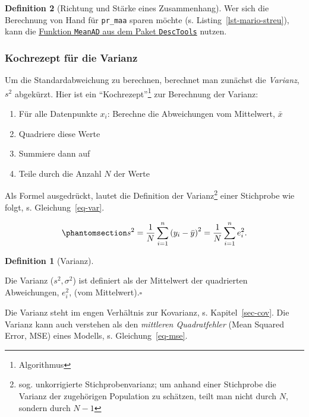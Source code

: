 \documentclass[
  a4paper,
  DIV=11]{scrreprt}
\providecommand{\tightlist}{%
  \setlength{\itemsep}{0pt}\setlength{\parskip}{0pt}}\usepackage{longtable,booktabs,array}
\theoremstyle{definition}
\theoremstyle{definition}
\theoremstyle{definition}
\newtheorem{definition}{Definition}[chapter]
\theoremstyle{remark}
\begin{document}
\begin{definition}[Richtung und Stärke eines
Zusammenhang]
Wer sich die Berechnung von Hand für \texttt{pr\_maa} sparen möchte (s.
Listing~\ref{lst-mario-streu}), kann die
\href{https://rdrr.io/cran/DescTools/man/MeanAD.html}{Funktion
\texttt{MeanAD} aus dem Paket \texttt{DescTools}} nutzen.

\subsubsection{Kochrezept für die
Varianz}\label{kochrezept-fuxfcr-die-varianz}

Um die Standardabweichung zu berechnen, berechnet man zunächst die
\emph{Varianz}, \(s^2\) abgekürzt. Hier ist ein
``Kochrezept''\footnote{Algorithmus} zur Berechnung der Varianz:

\begin{enumerate}
\def\labelenumi{\arabic{enumi}.}
\tightlist
\item
  Für alle Datenpunkte \(x_i\): Berechne die Abweichungen vom
  Mittelwert, \(\bar{x}\)
\item
  Quadriere diese Werte
\item
  Summiere dann auf
\item
  Teile durch die Anzahl \(N\) der Werte
\end{enumerate}

Als Formel ausgedrückt, lautet die Definition der Varianz\footnote{sog.
  unkorrigierte Stichprobenvarianz; um anhand einer Stichprobe die
  Varianz der zugehörigen Population zu schätzen, teilt man nicht durch
  \(N\), sondern durch \(N-1\)} einer Stichprobe wie folgt, s.
Gleichung~\ref{eq-var}.

\begin{equation}\phantomsection\label{eq-var}{{\displaystyle s^{2}={\frac {1}{N}}\sum _{i=1}^{n}\left(y_{i}-{\bar {y}}\right)^{2}={\frac {1}{N}}\sum _{i=1}^{n}e_i^{2}.}}\end{equation}

\begin{definition}[Varianz]\protect\hypertarget{def-var}{}\label{def-var}

Die Varianz (\(s^2, \sigma^2\)) ist definiert als der Mittelwert der
quadrierten Abweichungen, \(e_i^2\), (vom Mittelwert).\(\square\)

\end{definition}

Die Varianz steht im engen Verhältnis zur Kovarianz, s.
Kapitel~\ref{sec-cov}. Die Varianz kann auch verstehen als den
\emph{mittleren Quadratfehler} (Mean Squared Error, MSE) eines Modells,
s. Gleichung~\ref{eq-mse}.


\end{definition}
\end{document}
